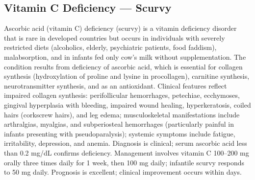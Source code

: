 \subsection{Vitamin C Deficiency --- Scurvy}
\label{sec:Vitamin C Deficiency}
Ascorbic acid (vitamin C) deficiency (scurvy) is a vitamin deficiency disorder that is rare in developed countries but occurs in individuals with severely restricted diets (alcoholics, elderly, psychiatric patients, food faddism), malabsorption, and in infants fed only cow's milk without supplementation. The condition results from deficiency of ascorbic acid, which is essential for collagen synthesis (hydroxylation of proline and lysine in procollagen), carnitine synthesis, neurotransmitter synthesis, and as an antioxidant. Clinical features reflect impaired collagen synthesis: perifollicular hemorrhages, petechiae, ecchymoses, gingival hyperplasia with bleeding, impaired wound healing, hyperkeratosis, coiled hairs (corkscrew hairs), and leg edema; musculoskeletal manifestations include arthralgias, myalgias, and subperiosteal hemorrhages (particularly painful in infants presenting with pseudoparalysis); systemic symptoms include fatigue, irritability, depression, and anemia. Diagnosis is clinical; serum ascorbic acid less than 0.2 mg/dL confirms deficiency. Management involves vitamin C 100--200 mg orally three times daily for 1 week, then 100 mg daily; infantile scurvy responds to 50 mg daily. Prognosis is excellent; clinical improvement occurs within days.

